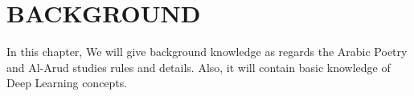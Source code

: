
\chapter{\uppercase{Background}}\label{Ch:Background}
In this chapter, We will give background knowledge as regards the Arabic Poetry and Al-Arud studies rules and details. Also, it will contain basic knowledge of Deep Learning concepts.







